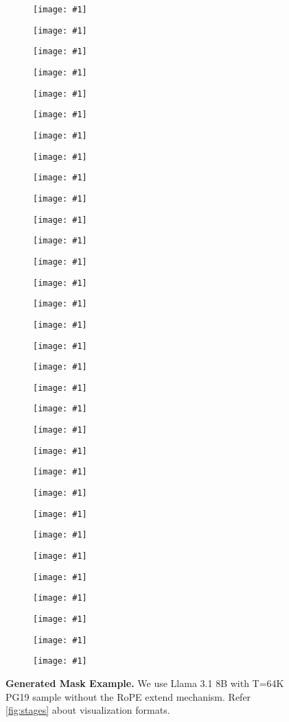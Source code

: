 \begin{figure}[htb]
\centering
\renewcommand\thesubfigure{\arabic{subfigure}}
\newcommand{\maskexample}[1]{%
    \begin{subfigure}[b]{0.125\linewidth}
        \centering
        \texttt{[image: \#1]}
        \caption{}
    \end{subfigure}%
}
\maskexample{figures/images/layer_mask_example/streaming_layer1.png}%
\maskexample{figures/images/layer_mask_example/streaming_layer2.png}%
\maskexample{figures/images/layer_mask_example/streaming_layer3.png}%
\maskexample{figures/images/layer_mask_example/streaming_layer4.png}%
\maskexample{figures/images/layer_mask_example/streaming_layer5.png}%
\maskexample{figures/images/layer_mask_example/streaming_layer6.png}%
\maskexample{figures/images/layer_mask_example/streaming_layer7.png}%
\maskexample{figures/images/layer_mask_example/streaming_layer8.png}%


\maskexample{figures/images/layer_mask_example/streaming_layer9.png}%
\maskexample{figures/images/layer_mask_example/streaming_layer10.png}%
\maskexample{figures/images/layer_mask_example/streaming_layer11.png}%
\maskexample{figures/images/layer_mask_example/streaming_layer12.png}%
\maskexample{figures/images/layer_mask_example/streaming_layer13.png}%
\maskexample{figures/images/layer_mask_example/streaming_layer14.png}%
\maskexample{figures/images/layer_mask_example/streaming_layer15.png}%
\maskexample{figures/images/layer_mask_example/streaming_layer16.png}%


\maskexample{figures/images/layer_mask_example/streaming_layer17.png}%
\maskexample{figures/images/layer_mask_example/streaming_layer18.png}%
\maskexample{figures/images/layer_mask_example/streaming_layer19.png}%
\maskexample{figures/images/layer_mask_example/streaming_layer20.png}%
\maskexample{figures/images/layer_mask_example/streaming_layer21.png}%
\maskexample{figures/images/layer_mask_example/streaming_layer22.png}%
\maskexample{figures/images/layer_mask_example/streaming_layer23.png}%
\maskexample{figures/images/layer_mask_example/streaming_layer24.png}%


\maskexample{figures/images/layer_mask_example/streaming_layer25.png}%
\maskexample{figures/images/layer_mask_example/streaming_layer26.png}%
\maskexample{figures/images/layer_mask_example/streaming_layer27.png}%
\maskexample{figures/images/layer_mask_example/streaming_layer28.png}%
\maskexample{figures/images/layer_mask_example/streaming_layer29.png}%
\maskexample{figures/images/layer_mask_example/streaming_layer30.png}%
\maskexample{figures/images/layer_mask_example/streaming_layer31.png}%
\maskexample{figures/images/layer_mask_example/streaming_layer32.png}%

\caption{\textbf{Generated Mask Example.} We use Llama 3.1 8B with T=64K PG19 sample without the RoPE extend mechanism. Refer \cref{fig:stages} about visualization formats.}
\label{fig:layer_mask_example}
\end{figure}